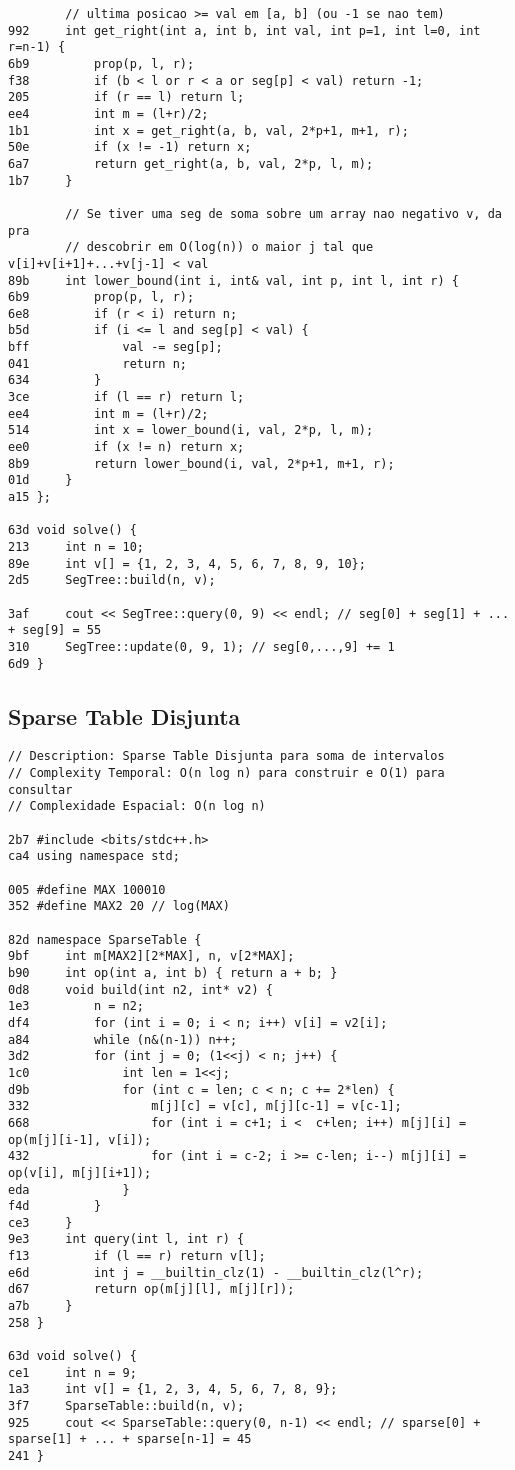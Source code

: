\documentclass[11pt, a4paper, twoside]{article}
\begin{document}
\begin{lstlisting}
    	// ultima posicao >= val em [a, b] (ou -1 se nao tem)
992 	int get_right(int a, int b, int val, int p=1, int l=0, int r=n-1) {
6b9 		prop(p, l, r);
f38 		if (b < l or r < a or seg[p] < val) return -1;
205 		if (r == l) return l;
ee4 		int m = (l+r)/2;
1b1 		int x = get_right(a, b, val, 2*p+1, m+1, r);
50e 		if (x != -1) return x;
6a7 		return get_right(a, b, val, 2*p, l, m);
1b7 	}
    
    	// Se tiver uma seg de soma sobre um array nao negativo v, da pra
    	// descobrir em O(log(n)) o maior j tal que v[i]+v[i+1]+...+v[j-1] < val
89b 	int lower_bound(int i, int& val, int p, int l, int r) {
6b9 		prop(p, l, r);
6e8 		if (r < i) return n;
b5d 		if (i <= l and seg[p] < val) {
bff 			val -= seg[p];
041 			return n;
634 		}
3ce 		if (l == r) return l;
ee4 		int m = (l+r)/2;
514 		int x = lower_bound(i, val, 2*p, l, m);
ee0 		if (x != n) return x;
8b9 		return lower_bound(i, val, 2*p+1, m+1, r);
01d 	}
a15 };

63d void solve() {
213 	int n = 10;
89e 	int v[] = {1, 2, 3, 4, 5, 6, 7, 8, 9, 10};
2d5 	SegTree::build(n, v);
    
3af 	cout << SegTree::query(0, 9) << endl; // seg[0] + seg[1] + ... + seg[9] = 55
310 	SegTree::update(0, 9, 1); // seg[0,...,9] += 1
6d9 }
\end{lstlisting}

\subsection{Sparse Table Disjunta}
\begin{lstlisting}
// Description: Sparse Table Disjunta para soma de intervalos
// Complexity Temporal: O(n log n) para construir e O(1) para consultar
// Complexidade Espacial: O(n log n)

2b7 #include <bits/stdc++.h>
ca4 using namespace std;

005 #define MAX 100010
352 #define MAX2 20 // log(MAX)

82d namespace SparseTable {
9bf 	int m[MAX2][2*MAX], n, v[2*MAX];
b90 	int op(int a, int b) { return a + b; }
0d8 	void build(int n2, int* v2) {
1e3 		n = n2;
df4 		for (int i = 0; i < n; i++) v[i] = v2[i];
a84 		while (n&(n-1)) n++;
3d2 		for (int j = 0; (1<<j) < n; j++) {
1c0 			int len = 1<<j;
d9b 			for (int c = len; c < n; c += 2*len) {
332 				m[j][c] = v[c], m[j][c-1] = v[c-1];
668 				for (int i = c+1; i <  c+len; i++) m[j][i] = op(m[j][i-1], v[i]);
432 				for (int i = c-2; i >= c-len; i--) m[j][i] = op(v[i], m[j][i+1]);
eda 			}
f4d 		}
ce3 	}
9e3 	int query(int l, int r) {
f13 		if (l == r) return v[l];
e6d 		int j = __builtin_clz(1) - __builtin_clz(l^r);
d67 		return op(m[j][l], m[j][r]);
a7b 	}
258 }

63d void solve() {
ce1 	int n = 9;
1a3 	int v[] = {1, 2, 3, 4, 5, 6, 7, 8, 9};
3f7 	SparseTable::build(n, v);
925 	cout << SparseTable::query(0, n-1) << endl; // sparse[0] + sparse[1] + ... + sparse[n-1] = 45
241 }
\end{lstlisting}
\end{document}
